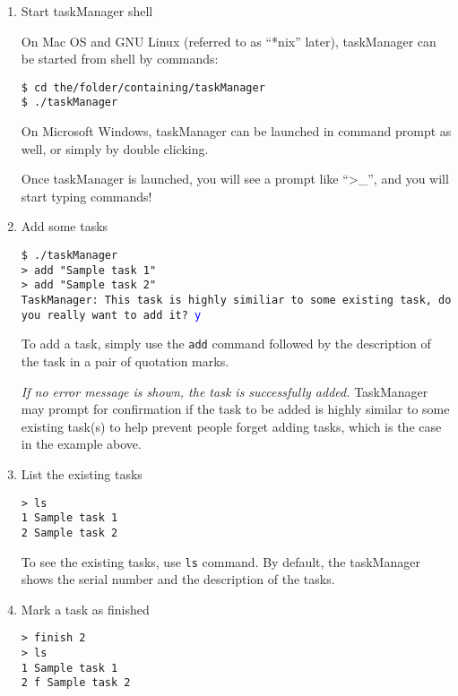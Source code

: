 \documentclass[12pt, a4paper]{article}
\begin{document}
\begin{enumerate}
\item Start taskManager shell

On Mac OS and GNU Linux (referred to as ``*nix'' later), taskManager can be started from shell by commands:

\texttt{\$ cd the/folder/containing/taskManager\\
  \$ ./taskManager \footnotemark}

On Microsoft Windows, taskManager can be launched in command prompt as well, or simply by double clicking.

Once taskManager is launched, you will see a prompt like ``\textgreater\_'', and you will start typing commands!


\item Add some tasks

\texttt{\$ ./taskManager\\
  \textgreater \  add "Sample task 1"\\
  \textgreater \  add "Sample task 2"\\
  TaskManager: This task is highly similiar to some existing task, do you really want to add it? \textcolor{blue}{y}}

To add a task, simply use the \texttt{add} command followed by the description of the task in a pair of quotation marks. 

\emph{If no error message is shown, the task is successfully added.}
TaskManager may prompt for confirmation if the task to be added is highly similar to some existing task(s) to help prevent people forget adding tasks, which is the case in the example above.

\item List the existing tasks

\texttt{\textgreater \ ls\\
  1   Sample task 1\\
  2   Sample task 2}

To see the existing tasks, use \texttt{ls} command. By default, the taskManager shows the serial number and the description of the tasks.

\item Mark a task as finished

\texttt{\textgreater \ finish 2\\
  \textgreater \ ls\\
  1   Sample task 1\\
  2 f Sample task 2}
 

\end{enumerate}
\end{document}
